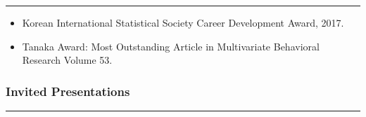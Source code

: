 \documentclass[
]{book}
\providecommand{\tightlist}{%
  \setlength{\itemsep}{0pt}\setlength{\parskip}{0pt}}
\begin{document}
\begin{center}\rule{0.5\linewidth}{0.5pt}\end{center}

\begin{itemize}
\tightlist
\item
  Korean International Statistical Society Career Development Award, 2017.
\item
  Tanaka Award: Most Outstanding Article in Multivariate Behavioral Research Volume 53.
\end{itemize}

\hypertarget{invited-presentations}{%
\subsubsection*{Invited Presentations}\label{invited-presentations}}

\begin{center}\rule{0.5\linewidth}{0.5pt}\end{center}
\end{document}
